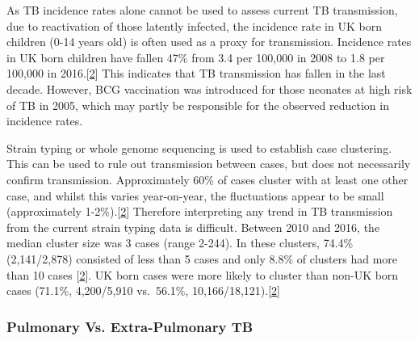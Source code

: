 \documentclass[11pt,twoside]{bristolthesis}
\begin{document}
  As TB incidence rates alone cannot be used to assess current TB transmission, due to reactivation of those latently infected, the incidence rate in UK born children (0-14 years old) is often used as a proxy for transmission. Incidence rates in UK born children have fallen 47\% from 3.4 per 100,000 in 2008 to 1.8 per 100,000 in 2016.{[}\protect\hyperlink{ref-PHE2017}{2}{]} This indicates that TB transmission has fallen in the last decade. However, BCG vaccination was introduced for those neonates at high risk of TB in 2005, which may partly be responsible for the observed reduction in incidence rates.
  
  Strain typing or whole genome sequencing is used to establish case clustering. This can be used to rule out transmission between cases, but does not necessarily confirm transmission. Approximately 60\% of cases cluster with at least one other case, and whilst this varies year-on-year, the fluctuations appear to be small (approximately 1-2\%).{[}\protect\hyperlink{ref-PHE2017}{2}{]} Therefore interpreting any trend in TB transmission from the current strain typing data is difficult. Between 2010 and 2016, the median cluster size was 3 cases (range 2-244). In these clusters, 74.4\% (2,141/2,878) consisted of less than 5 cases and only 8.8\% of clusters had more than 10 cases {[}\protect\hyperlink{ref-PHE2017}{2}{]}. UK born cases were more likely to cluster than non-UK born cases (71.1\%, 4,200/5,910 vs.~56.1\%, 10,166/18,121).{[}\protect\hyperlink{ref-PHE2017}{2}{]}
  
  \hypertarget{pulmonary-vs.-extra-pulmonary-tb}{%
  \subsubsection{Pulmonary Vs. Extra-Pulmonary TB}\label{pulmonary-vs.-extra-pulmonary-tb}}
  
\end{document}
